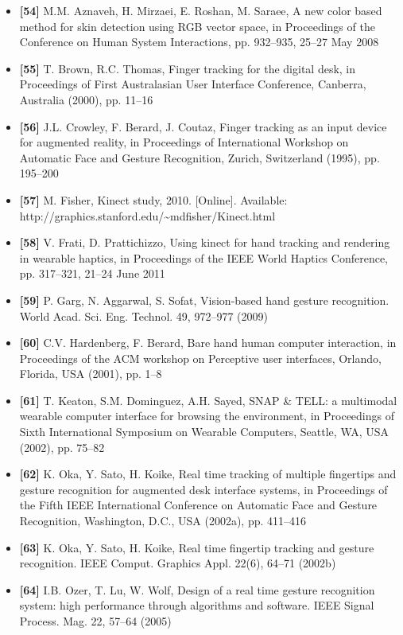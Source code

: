 \documentclass[12pt, a4paper]{article}
\begin{document}
\begin{itemize}[label=]
    \item \textbf{[54]} M.M. Aznaveh, H. Mirzaei, E. Roshan, M. Saraee, A new color based method for skin detection using RGB vector space, in Proceedings of the Conference on Human System Interactions, pp. 932–935, 25–27 May 2008
    \item \textbf{[55]} T. Brown, R.C. Thomas, Finger tracking for the digital desk, in Proceedings of First Australasian User Interface Conference, Canberra, Australia (2000), pp. 11–16
    \item \textbf{[56]} J.L. Crowley, F. Berard, J. Coutaz, Finger tracking as an input device for augmented reality, in Proceedings of International Workshop on Automatic Face and Gesture Recognition, Zurich, Switzerland (1995), pp. 195–200
    \item \textbf{[57]} M. Fisher, Kinect study, 2010. [Online]. Available: http://graphics.stanford.edu/\textasciitilde{}mdfisher/Kinect.html
    \item \textbf{[58]} V. Frati, D. Prattichizzo, Using kinect for hand tracking and rendering in wearable haptics, in Proceedings of the IEEE World Haptics Conference, pp. 317–321, 21–24 June 2011
    \item \textbf{[59]} P. Garg, N. Aggarwal, S. Sofat, Vision-based hand gesture recognition. World Acad. Sci. Eng. Technol. 49, 972–977 (2009)
    \item \textbf{[60]} C.V. Hardenberg, F. Berard, Bare hand human computer interaction, in Proceedings of the ACM workshop on Perceptive user interfaces, Orlando, Florida, USA (2001), pp. 1–8
    \item \textbf{[61]} T. Keaton, S.M. Dominguez, A.H. Sayed, SNAP \& TELL: a multimodal wearable computer interface for browsing the environment, in Proceedings of Sixth International Symposium on Wearable Computers, Seattle, WA, USA (2002), pp. 75–82
    \item \textbf{[62]} K. Oka, Y. Sato, H. Koike, Real time tracking of multiple fingertips and gesture recognition for augmented desk interface systems, in Proceedings of the Fifth IEEE International Conference on Automatic Face and Gesture Recognition, Washington, D.C., USA (2002a), pp. 411–416
    \item \textbf{[63]} K. Oka, Y. Sato, H. Koike, Real time fingertip tracking and gesture recognition. IEEE Comput. Graphics Appl. 22(6), 64–71 (2002b)
    \item \textbf{[64]} I.B. Ozer, T. Lu, W. Wolf, Design of a real time gesture recognition system: high performance through algorithms and software. IEEE Signal Process. Mag. 22, 57–64 (2005)

\end{itemize}
\end{document}
